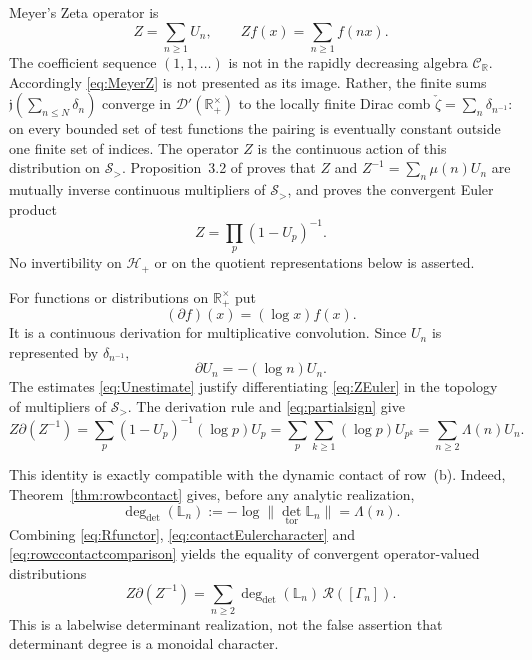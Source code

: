 \documentclass[11pt]{amsart}
\theoremstyle{definition}
\theoremstyle{remark}
\newcommand{\R}{\mathbb R}
\begin{document}
Meyer's Zeta operator is
\begin{equation}\label{eq:MeyerZ}
 Z=\sum_{n\geq1}U_n,\qquad Zf(x)=\sum_{n\geq1}f(nx).
\end{equation}
The coefficient sequence $(1,1,\ldots)$ is not in the rapidly decreasing
algebra $\mathcal C_{\R}$.  Accordingly \eqref{eq:MeyerZ} is not presented
as its image.  Rather, the finite sums
$\mathfrak j(\sum_{n\leq N}\delta_n)$ converge in
$\mathcal D'(\R_+^\times)$ to the locally finite Dirac comb
$\check\zeta=\sum_n\delta_{n^{-1}}$: on every bounded set of test functions
the pairing is eventually constant outside one finite set of indices.
The operator $Z$ is the continuous action of this distribution on
$\mathcal S_>$.
Proposition~3.2 of \cite{MeyerZeta} proves that $Z$ and
$Z^{-1}=\sum_n\mu(n)U_n$ are mutually inverse continuous multipliers of
$\mathcal S_>$, and proves the convergent Euler product
\begin{equation}\label{eq:ZEuler}
 Z=\prod_p(1-U_p)^{-1}.
\end{equation}
No invertibility on $\mathcal H_+$ or on the quotient representations below
is asserted.

For functions or distributions on $\R_+^\times$ put
\begin{equation}\label{eq:partialconvention}
 (\partial f)(x)=(\log x)f(x).
\end{equation}
It is a continuous derivation for multiplicative convolution.  Since
$U_n$ is represented by $\delta_{n^{-1}}$,
\begin{equation}\label{eq:partialsign}
 \partial U_n=-(\log n)U_n.
\end{equation}
The estimates \eqref{eq:Unestimate} justify differentiating
\eqref{eq:ZEuler} in the topology of multipliers of $\mathcal S_>$.  The
derivation rule and \eqref{eq:partialsign} give
\begin{equation}\label{eq:contactEulercharacter}
 Z\partial(Z^{-1})
 =\sum_p(1-U_p)^{-1}(\log p)U_p
 =\sum_p\sum_{k\geq1}(\log p)U_{p^k}
 =\sum_{n\geq2}\Lambda(n)U_n.
\end{equation}

This identity is exactly compatible with the dynamic contact of row~(b).
Indeed, Theorem~\ref{thm:rowbcontact} gives, before any analytic
realization,
\begin{equation}\label{eq:rowccontactcomparison}
 \deg_{\det}(\mathbb L_n)
 :=-\log\|\det_{\mathrm{tor}}\mathbb L_n\|=\Lambda(n).
\end{equation}
Combining \eqref{eq:Rfunctor}, \eqref{eq:contactEulercharacter} and
\eqref{eq:rowccontactcomparison} yields the equality of convergent
operator-valued distributions
\begin{equation}\label{eq:realizedcontact}
 Z\partial(Z^{-1})
 =\sum_{n\geq2}\deg_{\det}(\mathbb L_n)\,
       \mathcal R([\Gamma_n]).
\end{equation}
This is a labelwise determinant realization, not the false assertion that
determinant degree is a monoidal character.
\end{document}
